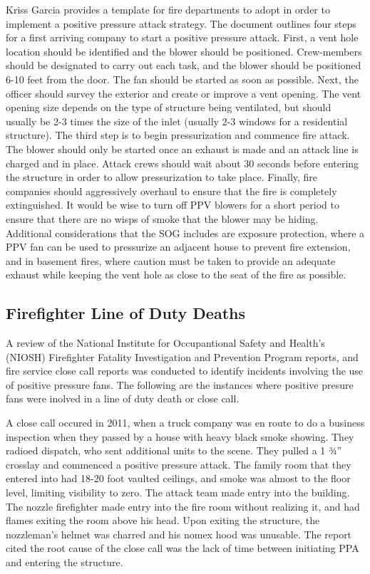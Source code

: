 \documentclass{article}
\begin{document}
Kriss Garcia provides a template for fire departments to adopt in order to implement a positive pressure attack strategy. The document outlines four steps for a first arriving company to start a positive pressure attack. First, a vent hole location should be identified and the blower should be positioned. Crew-members should be designated to carry out each task, and the blower should be positioned 6-10 feet from the door. The fan should be started as soon as possible. Next, the officer should survey the exterior and create or improve a vent opening. The vent opening size depends on the type of structure being ventilated, but should usually be 2-3 times the size of the inlet (usually 2-3 windows for a residential structure).  The third step is to begin pressurization and commence fire attack. The blower should only be started once an exhaust is made and an attack line is charged and in place. Attack crews should wait about 30 seconds before entering the structure in order to allow pressurization to take place. Finally, fire companies should aggressively overhaul to ensure that the fire is completely extinguished. It would be wise to turn off PPV blowers for a short period to ensure that there are no wisps of smoke that the blower may be hiding. Additional considerations that the SOG includes are exposure protection, where a PPV fan can be used to pressurize an adjacent house to prevent fire extension, and in basement fires, where caution must be taken to provide an adequate exhaust while keeping the vent hole as close to the seat of the fire as possible.\cite{SuggestedSOP}

\subsection{Firefighter Line of Duty Deaths}
A review of the National Institute for Occupantional Safety and Health's (NIOSH) Firefighter Fatality Investigation and Prevention Program reports, and fire service close call reports was conducted to identify incidents involving the use of positive pressure fans. The following are the instances where positive presure fans were inolved in a line of duty death or close call. 

A close call occured in 2011, when a truck company was en route to do a business inspection when they passed by a house with heavy black smoke showing. They radioed dispatch, who sent additional units to the scene. They pulled a 1 ¾” crosslay and commenced a positive pressure attack. The family room that they entered into had 18-20 foot vaulted ceilings, and smoke was almost to the floor level, limiting visibility to zero. The attack team made entry into the building. The nozzle firefighter made entry into the fire room without realizing it, and had flames exiting the room above his head. Upon exiting the structure, the nozzleman’s helmet was charred and his nomex hood was unusable. The report cited the root cause of the close call was the lack of time between initiating PPA and entering the structure.\cite{VaultedCeilingsFFCC}
\end{document}

